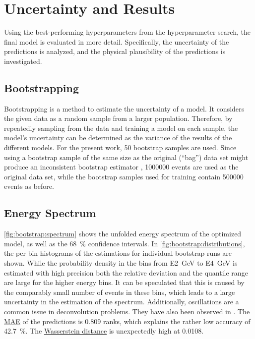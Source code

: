 \section{Uncertainty and Results}
Using the best-performing hyperparameters from the hyperparameter search, %
the final model is evaluated in more detail.
Specifically,
  the uncertainty of the predictions is analyzed, %
  and the physical plausibility of the predictions is investigated.


\subsection{Bootstrapping}
Bootstrapping \cite{bootstrap} is a method to estimate the uncertainty of a model.
It considers the given data as a random sample from a larger population.
Therefore,
by repeatedly sampling from the data and training a model on each sample,
the model's uncertainty can be determined
as the variance of the results of the different models.
%
For the present work, \num{50} bootstrap samples are used.
Since using a bootstrap sample of the same size as the original (\enquote{bag}) data set
might produce an inconsistent bootstrap estimator \cite{bootstrap_samplesize},
\num{1000000} events are used as the original data set,
while the bootstrap samples used for training contain \num{500000} events as before.


\subsection{Energy Spectrum}
\autoref{fig:bootstrap:spectrum} shows the unfolded energy spectrum of the optimized model,
as well as the \SI{68}{\percent} confidence intervals.
In \autoref{fig:bootstrap:distributions},
the per-bin histograms of the estimations for individual bootstrap runs are shown.
While the probability density in the bins from \SI{E2}{\giga\electronvolt} to \SI{E4}{\giga\electronvolt} is estimated with high precision
both the relative deviation and the quantile range are large for the higher energy bins.
It can be speculated that this is caused by the comparably small number of events in these bins,
which leads to a large uncertainty in the estimation of the spectrum.
Additionally,
oscillations are a common issue in deconvolution problems.
They have also been observed in \cite{dsea_samuel}.
%
The \hyperref[sec:unfolding:metrics:mae]{\ac{MAE}} of the predictions is \num{0.809} ranks,
  which explains the rather low accuracy of \SI{42.7}{\percent}.
The \hyperref[sec:unfolding:metrics:wasserstein]{Wasserstein distance}
is unexpectedly high at \num{0.0108}.

